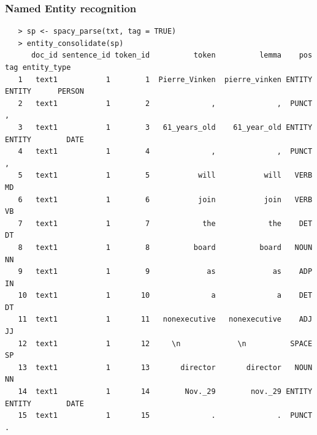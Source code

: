 \documentclass[11pt,handout]{beamer}
\begin{document}
\begin{frame}[fragile]
 \frametitle{Named Entity recognition}
 \scriptsize
 \begin{verbatim}
   > sp <- spacy_parse(txt, tag = TRUE)
   > entity_consolidate(sp)
      doc_id sentence_id token_id          token          lemma    pos    tag entity_type
   1   text1           1        1  Pierre_Vinken  pierre_vinken ENTITY ENTITY      PERSON
   2   text1           1        2              ,              ,  PUNCT      ,
   3   text1           1        3   61_years_old    61_year_old ENTITY ENTITY        DATE
   4   text1           1        4              ,              ,  PUNCT      ,
   5   text1           1        5           will           will   VERB     MD
   6   text1           1        6           join           join   VERB     VB
   7   text1           1        7            the            the    DET     DT
   8   text1           1        8          board          board   NOUN     NN
   9   text1           1        9             as             as    ADP     IN
   10  text1           1       10              a              a    DET     DT
   11  text1           1       11   nonexecutive   nonexecutive    ADJ     JJ
   12  text1           1       12     \n             \n          SPACE     SP
   13  text1           1       13       director       director   NOUN     NN
   14  text1           1       14        Nov._29        nov._29 ENTITY ENTITY        DATE
   15  text1           1       15              .              .  PUNCT      .
  \end{verbatim}
\end{frame}
\end{document}
